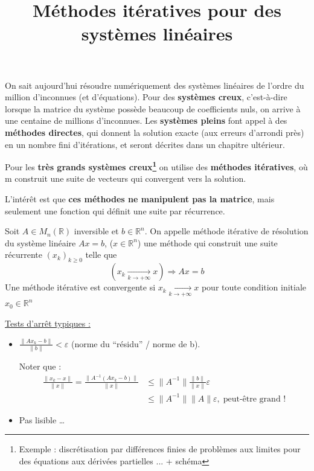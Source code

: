 \documentclass[a4paper,11pt]{article}
\title{\huge \bfseries Méthodes itératives pour des systèmes linéaires}
\date{}
\newcommand{\R}{\mathbb{R}}
\theoremstyle{plain} %
\begin{document}
\maketitle

On sait aujourd'hui résoudre numériquement des systèmes linéaires de l'ordre du million d'inconnues (et d'équations). Pour des \textbf{systèmes creux}, c'est-à-dire lorsque la matrice du système possède beaucoup de coefficients nuls, on arrive à une centaine de millions d'inconnues.
Les \textbf{systèmes pleins} font appel à des \textbf{méthodes directes}, qui donnent la solution exacte (aux erreurs d'arrondi près) en un nombre fini d'itérations, et seront décrites dans un chapitre ultérieur.

Pour les \textbf{très grands systèmes creux\footnote{Exemple : discrétisation par différences finies de problèmes aux limites pour des équations aux dérivées partielles ... + schéma}}
on utilise des \textbf{méthodes itératives}, où m construit une suite de vecteurs qui convergent vers la solution.

L'intérêt est que \textbf{ces méthodes ne manipulent pas la matrice}, mais seulement une fonction qui définit une suite par récurrence.

\begin{fdef}
    Soit $A \in M_n(\R)$ inversible et $b \in \R^n$. On appelle méthode itérative de résolution du système linéaire $Ax=b$, ($x \in \R^n$) 
    une méthode qui construit une suite récurrente $(x_k)_{k\geq0}$
    telle que $$(x_k \underset{k\to +\infty}{\longrightarrow} x) \Rightarrow Ax=b$$
    Une méthode itérative est convergente si $x_k \underset{k\to +\infty}{\longrightarrow}x$ pour toute condition initiale $x_0 \in \R^n$
\end{fdef}

\underline{Tests d'arrêt typiques :}

\renewcommand{\labelitemi}{\textbullet}
\begin{itemize}
    \item $\frac{\|Ax_k - b \|}{\|b\|} < \varepsilon$ (norme du ``résidu'' / norme de b).

        Noter que : 
        \begin{align*} \frac{\|x_k-x\|}{\|x\|} 
            = \frac{\|A^{-1}(Ax_k-b)\|}{\|x\|} 
            & \leq \|A^{-1}\| \frac{\|b\|}{\|x\|}\varepsilon 
            \\ & \leq \|A^{-1}\| \|A\| \varepsilon, 
            \; \mbox{peut-être grand !}\end{align*}

    \item Pas lisible \dots
\end{itemize}
\end{document}
